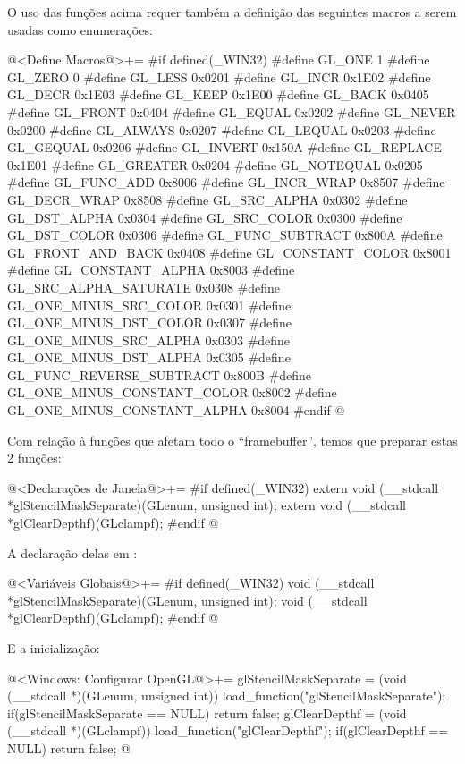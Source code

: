 O uso das funções acima requer também a definição das seguintes macros
a serem usadas como enumerações:

\iniciocodigo
@<Define Macros@>+=
#if defined(_WIN32)
#define GL_ONE                      1
#define GL_ZERO                     0
#define GL_LESS                     0x0201
#define GL_INCR                     0x1E02
#define GL_DECR                     0x1E03
#define GL_KEEP                     0x1E00
#define GL_BACK                     0x0405
#define GL_FRONT                    0x0404
#define GL_EQUAL                    0x0202
#define GL_NEVER                    0x0200
#define GL_ALWAYS                   0x0207
#define GL_LEQUAL                   0x0203
#define GL_GEQUAL                   0x0206
#define GL_INVERT                   0x150A
#define GL_REPLACE                  0x1E01
#define GL_GREATER                  0x0204
#define GL_NOTEQUAL                 0x0205
#define GL_FUNC_ADD                 0x8006
#define GL_INCR_WRAP                0x8507
#define GL_DECR_WRAP                0x8508
#define GL_SRC_ALPHA                0x0302
#define GL_DST_ALPHA                0x0304
#define GL_SRC_COLOR                0x0300
#define GL_DST_COLOR                0x0306
#define GL_FUNC_SUBTRACT            0x800A
#define GL_FRONT_AND_BACK           0x0408
#define GL_CONSTANT_COLOR           0x8001
#define GL_CONSTANT_ALPHA           0x8003
#define GL_SRC_ALPHA_SATURATE	    0x0308
#define GL_ONE_MINUS_SRC_COLOR      0x0301
#define GL_ONE_MINUS_DST_COLOR      0x0307
#define GL_ONE_MINUS_SRC_ALPHA      0x0303
#define GL_ONE_MINUS_DST_ALPHA      0x0305
#define GL_FUNC_REVERSE_SUBTRACT    0x800B
#define GL_ONE_MINUS_CONSTANT_COLOR 0x8002
#define GL_ONE_MINUS_CONSTANT_ALPHA 0x8004
#endif
@
\fimcodigo

Com relação à funções que afetam todo o ``framebuffer'', temos que
preparar estas 2 funções:

\iniciocodigo
@<Declarações de Janela@>+=
#if defined(_WIN32)
extern void (__stdcall *glStencilMaskSeparate)(GLenum, unsigned int);
extern void (__stdcall *glClearDepthf)(GLclampf);
#endif
@
\fimcodigo

A declaração delas em :

\iniciocodigo
@<Variáveis Globais@>+=
#if defined(_WIN32)
void (__stdcall *glStencilMaskSeparate)(GLenum, unsigned int);
void (__stdcall *glClearDepthf)(GLclampf);
#endif
@
\fimcodigo

E a inicialização:

\iniciocodigo
@<Windows: Configurar OpenGL@>+=
glStencilMaskSeparate = (void (__stdcall *)(GLenum, unsigned int))
                            load_function("glStencilMaskSeparate");
if(glStencilMaskSeparate == NULL) return false;
glClearDepthf = (void (__stdcall *)(GLclampf)) load_function("glClearDepthf");
if(glClearDepthf == NULL) return false;
@
\fimcodigo

